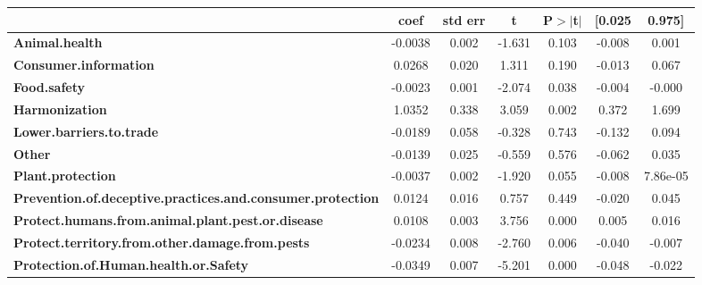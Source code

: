 \begin{center}
\begin{tabular}{lcccccc}
                                                                   & \textbf{coef} & \textbf{std err} & \textbf{t} & \textbf{P$> |$t$|$} & \textbf{[0.025} & \textbf{0.975]}  \\
\midrule
\textbf{Animal.health}                                             &      -0.0038  &        0.002     &    -1.631  &         0.103        &       -0.008    &        0.001     \\
\textbf{Consumer.information}                                      &       0.0268  &        0.020     &     1.311  &         0.190        &       -0.013    &        0.067     \\
\textbf{Food.safety}                                               &      -0.0023  &        0.001     &    -2.074  &         0.038        &       -0.004    &       -0.000     \\
\textbf{Harmonization}                                             &       1.0352  &        0.338     &     3.059  &         0.002        &        0.372    &        1.699     \\
\textbf{Lower.barriers.to.trade}                                   &      -0.0189  &        0.058     &    -0.328  &         0.743        &       -0.132    &        0.094     \\
\textbf{Other}                                                     &      -0.0139  &        0.025     &    -0.559  &         0.576        &       -0.062    &        0.035     \\
\textbf{Plant.protection}                                          &      -0.0037  &        0.002     &    -1.920  &         0.055        &       -0.008    &     7.86e-05     \\
\textbf{Prevention.of.deceptive.practices.and.consumer.protection} &       0.0124  &        0.016     &     0.757  &         0.449        &       -0.020    &        0.045     \\
\textbf{Protect.humans.from.animal.plant.pest.or.disease}          &       0.0108  &        0.003     &     3.756  &         0.000        &        0.005    &        0.016     \\
\textbf{Protect.territory.from.other.damage.from.pests}            &      -0.0234  &        0.008     &    -2.760  &         0.006        &       -0.040    &       -0.007     \\
\textbf{Protection.of.Human.health.or.Safety}                      &      -0.0349  &        0.007     &    -5.201  &         0.000        &       -0.048    &       -0.022     \\

\end{tabular}
\end{center}
